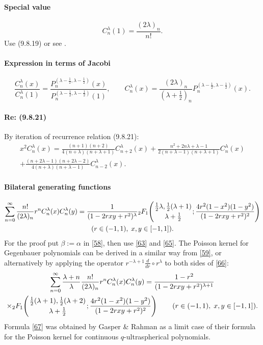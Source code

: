 \documentclass[twoside,11pt]{article}
\newcommand\al\alpha
\newcommand\be\beta
\newcommand\la\lambda
\newcommand\half{\frac12}
\newcommand\thalf{\tfrac12}
\newcommand\iy\infty
\newcommand{\hyp}[5]{ \mbox{}_{#1}F_{#2}\!\left(
  \genfrac{}{}{0pt}{}{#3}{#4};#5\right)}
\begin{document}
\paragraph{Special value}
\begin{equation}
C_n^{\la}(1)=\frac{(2\la)_n}{n!} .
\label{49}
\end{equation}
Use (9.8.19) or see .
%
\paragraph{Expression in terms of Jacobi}
%
\begin{equation}
\frac{C_n^\la(x)}{C_n^\la(1)}=
\frac{P_n^{(\la-\half,\la-\half)}(x)}{P_n^{(\la-\half,\la-\half)}(1)} ,\qquad
C_n^\la(x)=\frac{(2\la)_n}{(\la+\thalf)_n} P_n^{(\la-\half,\la-\half)}(x).
\label{65}
\end{equation}
%
\paragraph{Re: (9.8.21)}
By iteration of recurrence relation (9.8.21):
\begin{multline}
x^2 C_n^\la(x)=
\frac{(n+1)(n+2)}{4(n+\la)(n+\la+1)} C_{n+2}^\la(x)+
\frac{n^2+2n\la+\la-1}{2(n+\la-1)(n+\la+1)} C_n^\la(x)\\
+\frac{(n+2\la-1)(n+2\la-2)}{4(n+\la)(n+\la-1)} C_{n-2}^\la(x).
\label{6}
\end{multline}
%
\paragraph{Bilateral generating functions}
\begin{multline}
\sum_{n=0}^\iy\frac{n!}{(2\la)_n} r^n C_n^\la(x) C_n^\la(y)
=\frac1{(1-2rxy+r^2)^\la} \hyp21{\thalf\la,\thalf(\la+1)}{\la+\thalf}
{\frac{4r^2(1-x^2)(1-y^2)}{(1-2rxy+r^2)^2}}\\
(r\in(-1,1),\;x,y\in[-1,1]).
\label{66}
\end{multline}
For the proof put $\be:=\al$ in \eqref{58}, then use \eqref{63} and \eqref{65}.
The Poisson kernel for Gegenbauer polynomials can be derived in a similar way
from \eqref{59}, or alternatively by applying the operator
$r^{-\la+1}\frac d{dr}\circ r^\la$ to both sides of \eqref{66}:
\begin{multline}
\sum_{n=0}^\iy\frac{\la+n}\la \frac{n!}{(2\la)_n} r^n C_n^\la(x) C_n^\la(y)
=\frac{1-r^2}{(1-2rxy+r^2)^{\la+1}}\\
\times\hyp21{\thalf(\la+1),\thalf(\la+2)}{\la+\thalf}
{\frac{4r^2(1-x^2)(1-y^2)}{(1-2rxy+r^2)^2}}\qquad
(r\in(-1,1),\;x,y\in[-1,1]).
\label{67}
\end{multline}
Formula \eqref{67} was obtained by Gasper \& Rahman 
as a limit case of their formula for the Poisson kernel for continuous
$q$-ultraspherical polynomials.
%
\end{document}
